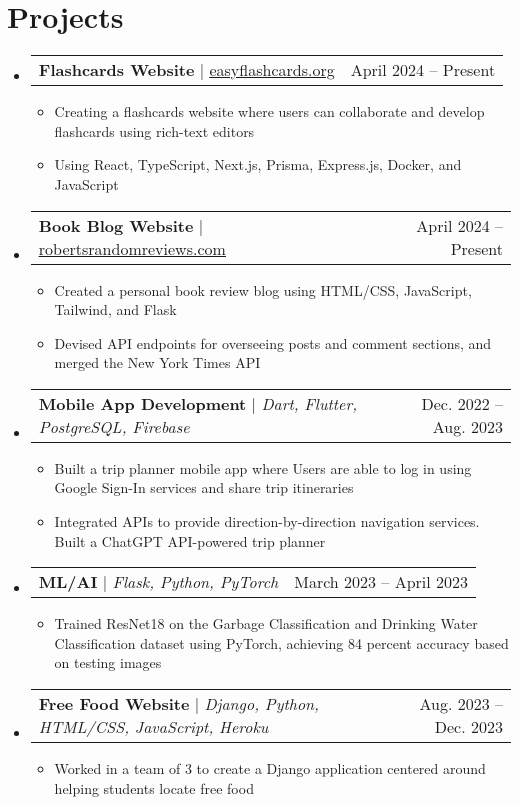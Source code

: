 \documentclass[letterpaper,11pt]{article}
\makeatletter
\newcommand{\resumeItem}[1]{
  \item\small{
    {#1 \vspace{-2pt}}
  }
}
\newcommand{\resumeProjectHeading}[2]{
    \item
    \begin{tabular*}{0.97\textwidth}{l@{\extracolsep{\fill}}r}
      \small#1 & #2 \\
    \end{tabular*}\vspace{-7pt}
}
\newcommand{\resumeSubHeadingListStart}{\begin{itemize}[leftmargin=0.15in, label={}]}
\newcommand{\resumeSubHeadingListEnd}{\end{itemize}}
\newcommand{\resumeItemListStart}{\begin{itemize}}
\newcommand{\resumeItemListEnd}{\end{itemize}\vspace{-5pt}}
\makeatother
\begin{document}
\section{Projects}
    \resumeSubHeadingListStart
      \resumeProjectHeading
          {\textbf{Flashcards Website} $|$ \href{https://easyflashcards.org/}{\underline{easyflashcards.org}}}{April 2024 -- Present}
          \resumeItemListStart
            \resumeItem{Creating a flashcards website where users can collaborate and develop flashcards using rich-text editors}
            \resumeItem{Using React, TypeScript, Next.js, Prisma, Express.js, Docker, and JavaScript}
          \resumeItemListEnd
      \resumeProjectHeading
          {\textbf{Book Blog Website} $|$ \href{https://robertsrandomreviews.com/}{\underline{robertsrandomreviews.com}}}{April 2024 -- Present}
          \resumeItemListStart
            \resumeItem{Created a personal book review blog using HTML/CSS, JavaScript, Tailwind, and Flask}
            \resumeItem{Devised API endpoints for overseeing posts and comment sections, and merged the New York Times API}
          \resumeItemListEnd
        \resumeProjectHeading
          {\textbf{Mobile App Development} $|$ \emph{Dart, Flutter, PostgreSQL, Firebase}}{Dec. 2022 -- Aug. 2023}
          \resumeItemListStart
            \resumeItem{Built a trip planner mobile app where Users are able to log in using Google Sign-In services and share trip itineraries}
            \resumeItem{Integrated APIs to provide direction-by-direction navigation services. Built a ChatGPT API-powered trip planner}
          \resumeItemListEnd
        \resumeProjectHeading
          {\textbf{ML/AI} $|$ \emph{Flask, Python, PyTorch}}{March 2023 -- April 2023}
          \resumeItemListStart
            \resumeItem{Trained ResNet18 on the Garbage Classification and Drinking Water Classification dataset using PyTorch, achieving 84 percent accuracy based on testing images}
          \resumeItemListEnd
        \resumeProjectHeading
          {\textbf{Free Food Website} $|$ \emph{Django, Python, HTML/CSS, JavaScript, Heroku}}{Aug. 2023 -- Dec. 2023}
          \resumeItemListStart
            \resumeItem{Worked in a team of 3 to create a Django application centered around helping students locate free food}
          \resumeItemListEnd
    \resumeSubHeadingListEnd



%
\end{document}

